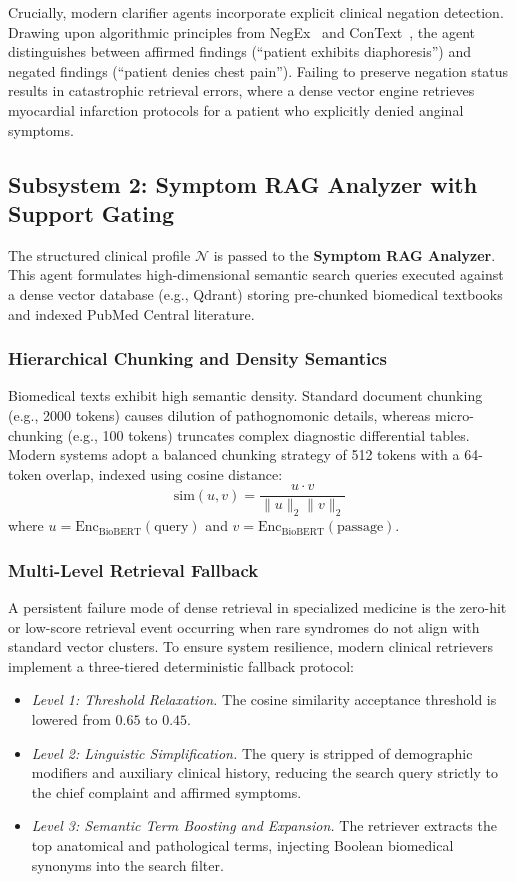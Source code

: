 \documentclass[conference]{IEEEtran}
\begin{document}
Crucially, modern clarifier agents incorporate explicit clinical negation detection. Drawing upon algorithmic principles from NegEx~\cite{chapman2001simple} and ConText~\cite{harkema2009context}, the agent distinguishes between affirmed findings (``patient exhibits diaphoresis'') and negated findings (``patient denies chest pain''). Failing to preserve negation status results in catastrophic retrieval errors, where a dense vector engine retrieves myocardial infarction protocols for a patient who explicitly denied anginal symptoms.

\subsection{Subsystem 2: Symptom RAG Analyzer with Support Gating}
The structured clinical profile $\mathcal{N}$ is passed to the \textbf{Symptom RAG Analyzer}. This agent formulates high-dimensional semantic search queries executed against a dense vector database (e.g., Qdrant) storing pre-chunked biomedical textbooks and indexed PubMed Central literature.

\subsubsection{Hierarchical Chunking and Density Semantics}
Biomedical texts exhibit high semantic density. Standard document chunking (e.g., 2000 tokens) causes dilution of pathognomonic details, whereas micro-chunking (e.g., 100 tokens) truncates complex diagnostic differential tables. Modern systems adopt a balanced chunking strategy of 512 tokens with a 64-token overlap, indexed using cosine distance:
\begin{equation}
\text{sim}(u, v) = \frac{u \cdot v}{\|u\|_2 \|v\|_2}
\end{equation}
where $u = \text{Enc}_{\text{BioBERT}}(\text{query})$ and $v = \text{Enc}_{\text{BioBERT}}(\text{passage})$.

\subsubsection{Multi-Level Retrieval Fallback}
A persistent failure mode of dense retrieval in specialized medicine is the zero-hit or low-score retrieval event occurring when rare syndromes do not align with standard vector clusters. To ensure system resilience, modern clinical retrievers implement a three-tiered deterministic fallback protocol:
\begin{itemize}
    \item \textit{Level 1: Threshold Relaxation.} The cosine similarity acceptance threshold is lowered from $0.65$ to $0.45$.
    \item \textit{Level 2: Linguistic Simplification.} The query is stripped of demographic modifiers and auxiliary clinical history, reducing the search query strictly to the chief complaint and affirmed symptoms.
    \item \textit{Level 3: Semantic Term Boosting and Expansion.} The retriever extracts the top anatomical and pathological terms, injecting Boolean biomedical synonyms into the search filter.
\end{itemize}
\end{document}
